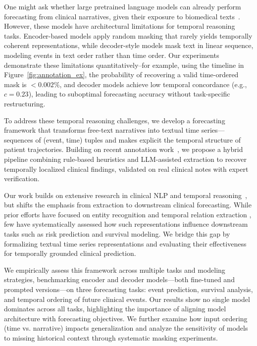 One might ask whether large pretrained language models can already perform forecasting from clinical narratives, given their exposure to biomedical texts~\citep{peng2020empirical,weber2024redpajama}. However, these models have architectural limitations for temporal reasoning tasks. Encoder-based models apply random masking that rarely yields temporally coherent representations, while decoder-style models mask text in linear sequence, modeling events in text order rather than time order. Our experiments demonstrate these limitations quantitatively--for example, using the timeline in Figure~\ref{fig:annotation_ex}, the probability of recovering a valid time-ordered mask is $<0.002\%$, and decoder models achieve low temporal concordance (e.g., $c=0.23$), leading to suboptimal forecasting accuracy without task-specific restructuring.

To address these temporal reasoning challenges, we develop a forecasting framework that
transforms free-text narratives into textual time series—sequences of (event, time) tuples and makes explicit the temporal structure of patient trajectories. Building on recent annotation work~\citep{wang2025large}, we propose a hybrid pipeline combining rule-based heuristics and LLM-assisted extraction to recover temporally localized clinical findings, validated on real clinical notes with expert verification.

Our work builds on extensive research in clinical NLP and temporal reasoning~\citep{kohane1987temporal, leeuwenberg2020towards, cheng2023typed}, but shifts the emphasis from extraction to downstream clinical forecasting. While prior efforts have focused on entity recognition and temporal relation extraction \citep{zhou2007temporal, uzuner20112010, sun2013evaluating}, few have systematically assessed how such representations influence downstream tasks such as risk prediction and survival modeling. We bridge this gap by formalizing textual time series representations and evaluating their effectiveness for temporally grounded clinical prediction.

We empirically assess this framework across multiple tasks and modeling strategies, benchmarking encoder and decoder models—both fine-tuned and prompted versions—on three forecasting tasks: event prediction, survival analysis, and temporal ordering of future clinical events. Our results show no single model dominates across all tasks, highlighting the importance of aligning model architecture with forecasting objectives. We further examine how input ordering (time vs. narrative) impacts generalization and analyze the sensitivity of models to missing historical context through systematic masking experiments.

